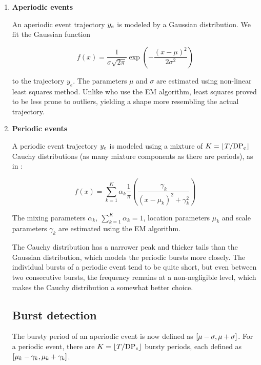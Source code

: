 \begin{enumerate}

\item \textbf{Aperiodic events}

An aperiodic event trajectory $y_{e}$ is modeled by a Gaussian distribution. We fit the Gaussian function

\begin{equation*}
	f(x) = \frac{1}{\sigma \sqrt{2 \pi}} \exp(-\frac{\left( x - \mu \right)^{2}}{2 \sigma^{2}})
\end{equation*}

to the trajectory $y_{e}$. The parameters $\mu$ and $\sigma$ are estimated using non-linear least squares method. Unlike \cite{event-detection} who use the EM algorithm, least squares proved to be less prone to outliers, yielding a shape more resembling the actual trajectory.

\item \textbf{Periodic events}

A periodic event trajectory $y_{e}$ is modeled using a mixture of $K = \lfloor T / \text{DP}_{e}\rfloor$ Cauchy distributions (as many mixture components as there are periods), as in \cite{health-events}:

\begin{equation*}
	f(x) = \sum_{k = 1}^{K}{\alpha_{k} \frac{1}{\pi} \left( \frac{\gamma_{k}}{\left( x - \mu_{k} \right)^{2} + \gamma_{k}^{2}} \right)}
\end{equation*}

The mixing parameters $\alpha_{k},\ \sum_{k = 1}^{K}{\alpha_{k}} = 1$, location parameters $\mu_{k}$ and scale parameters $\gamma_{k}$ are estimated using the EM algorithm.

The Cauchy distribution has a narrower peak and thicker tails than the Gaussian distribution, which models the periodic bursts more closely. The individual bursts of a periodic event tend to be quite short, but even between two consecutive bursts, the frequency remains at a non-negligible level, which makes the Cauchy distribution a somewhat better choice.


\subsection{Burst detection}
The bursty period of an aperiodic event is now defined as $\interval{\mu - \sigma}{\mu + \sigma}$. For a periodic event, there are $K = \lfloor T / \text{DP}_{e}\rfloor$ bursty periods, each defined as $\interval{\mu_{k} - \gamma_{k}}{\mu_{k} + \gamma_{k}}$.




\end{enumerate}
